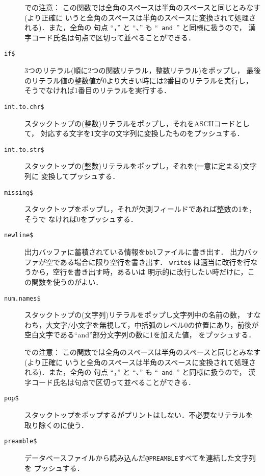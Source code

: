 \begin{description}
{\dg \JBibTeX での注意}：
この関数では全角のスペースは半角のスペースと同じとみなす(より正確に
いうと全角のスペースは半角のスペースに変換されて処理される)．また，全角の
句点 ``，'' と ``、'' も ``\verb*| and |'' と同様に扱うので，
漢字コード氏名は句点で区切って並べることができる．


\item[\hbox{\tt if\$}\hfill]
3つのリテラル(順に2つの関数リテラル，整数リテラル)をポップし，
最後のリテラル値の整数値が0より大きい時には2番目のリテラルを実行し，
そうでなければ1番目のリテラルを実行する．

\item[\hbox{\tt int.to.chr\$}\hfill]
スタックトップの(整数)リテラルをポップし，それをASCIIコードとして，
対応する文字を1文字の文字列に変換したものをプッシュする．

\item[\hbox{\tt int.to.str\$}\hfill]
スタックトップの(整数)リテラルをポップし，それを(一意に定まる)文字列に
変換してプッシュする．

\item[\hbox{\tt missing\$}\hfill]
スタックトップをポップし，それが欠測フィールドであれば整数の1を，そうで
なければ0をプッシュする．

\item[\hbox{\tt newline\$}\hfill]
出力バッファに蓄積されている情報を{\tt bbl}ファイルに書き出す．
出力バッファが空である場合に限り空行を書き出す．
{\tt write\$} は適当に改行を行なうから，空行を書き出す時，あるいは
明示的に改行したい時だけに，この関数を使うのがよい．

\item[\hbox{\tt num.names\$}\hfill]
スタックトップの(文字列)リテラルをポップし文字列中の名前の数，
すなわち，大文字/小文字を無視して，中括弧のレベル0の位置にあり，前後が
空白文字である``and''部分文字列の数に1を加えた値，
をプッシュする．

{\dg \JBibTeX での注意}：
この関数では全角のスペースは半角のスペースと同じとみなす(より正確に
いうと全角のスペースは半角のスペースに変換されて処理される)．また，全角の
句点 ``，'' と ``、'' も ``\verb*| and |'' と同様に扱うので，
漢字コード氏名は句点で区切って並べることができる．

\item[\hbox{\tt pop\$}\hfill]
スタックトップをポップするがプリントはしない．不必要なリテラルを
取り除くのに使う．

\item[\hbox{\tt preamble\$}\hfill]
データベースファイルから読み込んだ{\tt @PREAMBLE}すべてを連結した文字列を
プッシュする．


\end{description}
